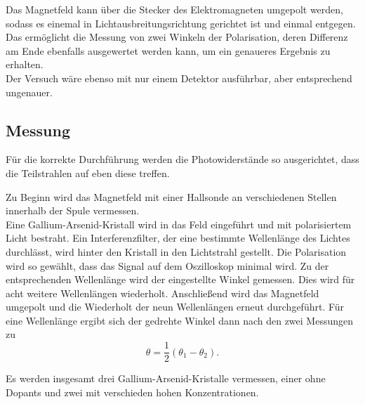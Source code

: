 Das Magnetfeld kann über die Stecker des Elektromagneten umgepolt werden, sodass es einemal in Lichtausbreitungsrichtung gerichtet ist und einmal entgegen. Das ermöglicht die Messung von zwei Winkeln der Polarisation,
deren Differenz am Ende ebenfalls ausgewertet werden kann, um ein genaueres Ergebnis zu erhalten. \\

Der Versuch wäre ebenso mit nur einem Detektor ausführbar, aber entsprechend ungenauer.\\

\subsection{Messung}

Für die korrekte Durchführung werden die Photowiderstände so ausgerichtet, dass die Teilstrahlen auf eben diese treffen. 

Zu Beginn wird das Magnetfeld mit einer Hallsonde an verschiedenen Stellen innerhalb der Spule vermessen. \\

Eine Gallium-Arsenid-Kristall wird in das Feld eingeführt und mit polarisiertem Licht bestraht. Ein Interferenzfilter, der eine bestimmte Wellenlänge des Lichtes durchlässt, wird hinter den Kristall in den Lichtstrahl gestellt.
Die Polarisation wird so gewählt, dass das Signal auf dem Oszilloskop minimal wird. Zu der entsprechenden Wellenlänge wird der eingestellte Winkel gemessen. Dies wird für acht weitere Wellenlängen wiederholt. Anschließend wird das Magnetfeld
umgepolt und die Wiederholt der neun Wellenlängen erneut durchgeführt. Für eine Wellenlänge ergibt sich der gedrehte Winkel dann nach den zwei Messungen zu
\begin{equation}
    \theta = \frac{1}{2}(\theta_1 - \theta_2).
    \label{eq:theta}
\end{equation}

Es werden insgesamt drei Gallium-Arsenid-Kristalle vermessen, einer ohne Dopants und zwei mit verschieden hohen Konzentrationen. \\

